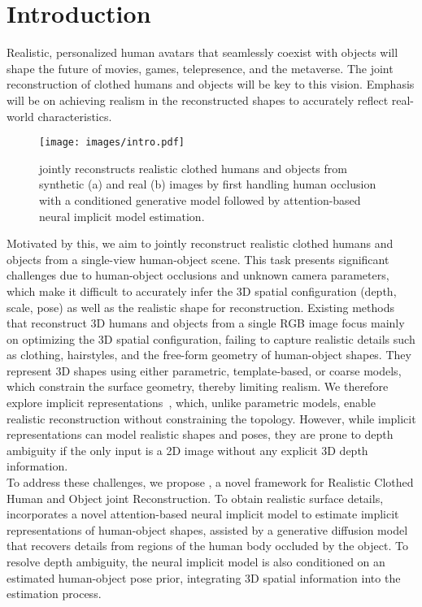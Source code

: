 \vspace{-0.5cm}
\section{Introduction}
\label{sec:intro}
Realistic, personalized human avatars that seamlessly coexist with objects will shape the future of movies, games, telepresence, and the metaverse. The joint reconstruction of clothed humans and objects will be key to this vision. Emphasis will be on achieving realism in the reconstructed shapes to accurately reflect real-world characteristics. 
\begin{figure}[!t]
  \centering
\texttt{[image: images/intro.pdf]}
\vspace{-7mm}
\caption{\name jointly reconstructs realistic clothed humans and objects from synthetic (a) and real (b) images by first handling human occlusion with a conditioned generative model followed by attention-based neural implicit model estimation.}
\label{fig:intro}
\vspace{-8mm}
\end{figure}
Motivated by this, we aim to jointly reconstruct realistic clothed humans and objects from a single-view human-object scene. This task presents significant challenges due to human-object occlusions and unknown camera parameters, which make it difficult to accurately infer the 3D spatial configuration (depth, scale, pose) as well as the realistic shape for reconstruction. Existing methods ~\cite{xie2022chore, zhang2020perceiving, nam2024contho, xie2023template_free, xie2023vistracker} that reconstruct 3D humans and objects from a single RGB image focus mainly on optimizing the 3D spatial configuration, failing to capture realistic details such as clothing, hairstyles, and the free-form geometry of human-object shapes. They represent 3D shapes using either parametric, template-based, or coarse models, which constrain the surface geometry, thereby limiting realism. We therefore explore implicit representations~\cite{mescheder2019occupancy, chen2019learning, park2019deepsdf}, which, unlike parametric models, enable realistic reconstruction without constraining the topology. However, while implicit representations can model realistic shapes and poses, they are prone to depth ambiguity if the only input is a 2D image without any explicit 3D depth information.
\\
To address these challenges, we propose \name, a novel framework for Realistic Clothed Human and Object joint Reconstruction. To obtain realistic surface details, \name incorporates a novel attention-based neural implicit model to estimate implicit representations of human-object shapes, assisted by a generative diffusion model that recovers details from regions of the human body occluded by the object. To resolve depth ambiguity, the neural implicit model is also conditioned on an estimated human-object pose prior, integrating 3D spatial information into the estimation process.
